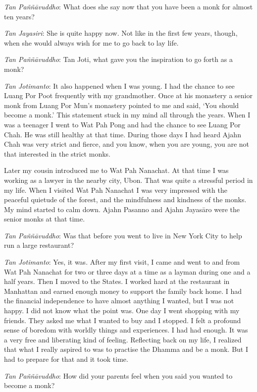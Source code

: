 \emph{Tan Paññāvuddho}: What does she say now that you have been a monk
for almost ten years? 

\emph{Tan Jayasiri}: She is quite happy now. Not like in the first few
years, though, when she would always wish for me to go back to lay life. 

\emph{Tan Paññāvuddho}: Tan Joti, what gave you the inspiration to go
forth as a monk? 

\emph{Tan Jotimanto}: It also happened when I was young. I had the
chance to see Luang Por Poot frequently with my grandmother. Once at his
monastery a senior monk from Luang Por Mun's monastery pointed to me and
said, `You should become a monk.' This statement stuck in my mind all
through the years. When I was a teenager I went to Wat Pah Pong and had
the chance to see Luang Por Chah. He was still healthy at that time. 
During those days I had heard Ajahn Chah was very strict and fierce, and
you know, when you are young, you are not that interested in the strict
monks. 

Later my cousin introduced me to Wat Pah Nanachat. At that time I was
working as a lawyer in the nearby city, Ubon. That was quite a stressful
period in my life. When I visited Wat Pah Nanachat I was very impressed
with the peaceful quietude of the forest, and the mindfulness and
kindness of the monks. My mind started to calm down. Ajahn Pasanno and
Ajahn Jayasāro were the senior monks at that time. 

\emph{Tan Paññāvuddho}: Was that before you went to live in New York
City to help run a large restaurant? 

\emph{Tan Jotimanto}: Yes, it was. After my first visit, I came and went
to and from Wat Pah Nanachat for two or three days at a time as a layman
during one and a half years. Then I moved to the States. I worked hard
at the restaurant in Manhattan and earned enough money to support the
family back home. I had the financial independence to have almost
anything I wanted, but I was not happy. I did not know what the point
was. One day I went shopping with my friends. They asked me what I
wanted to buy and I stopped. I felt a profound sense of boredom with
worldly things and experiences. I had had enough. It was a very free and
liberating kind of feeling. Reflecting back on my life, I realized that
what I really aspired to was to practise the Dhamma and be a monk. But I
had to prepare for that and it took time. 

\emph{Tan Paññāvuddho}: How did your parents feel when you said you
wanted to become a monk? 

